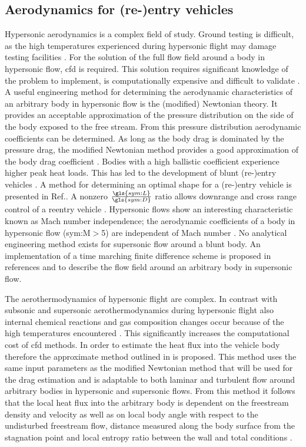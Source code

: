 \subsection{Aerodynamics for (re-)entry vehicles} \label{sec:aero}
Hypersonic aerodynamics is a complex field of study. Ground testing is difficult, as the high temperatures experienced during hypersonic flight may damage testing facilities \cite{AndersonJr.2006, Bertin1994}. For the solution of the full flow field around a body in hypersonic flow, \gls{cfd} is required. This solution requires significant knowledge of the problem to implement, is computationally expensive and difficult to validate \cite{AndersonJr.2006, Bertin1994}. A useful engineering method for determining the aerodynamic characteristics of an arbitrary body in hypersonic flow is the (modified) Newtonian theory. It provides an acceptable approximation of the pressure distribution on the side of the body exposed to the free stream. From this pressure distribution aerodynamic coefficients can be determined. As long as the body drag is dominated by the pressure drag, the modified Newtonian method provides a good approximation of the body drag coefficient \cite{AndersonJr.2006, Bertin1994, Bertin2006}. Bodies with a high ballistic coefficient experience higher peak heat loads. This has led to the development of blunt (re-)entry vehicles \cite{Bertin1994,Theisinger2009}. A method for determining an optimal shape for a (re-)entry vehicle is presented in Ref.\cite{Theisinger2009}. A nonzero $\frac{\gls{sym:L}}{\gls{sym:D}}$ ratio allows downrange and cross range control of a reentry vehicle \cite{Theisinger2009}. Hypersonic flows show an interesting characteristic known as Mach number independence; the aerodynamic coefficients of a body in hypersonic flow (\gls{sym:M}$>$5) are independent of Mach number \cite{Bertin1994,AndersonJr.2007,Hollis}. No analytical engineering method exists for supersonic flow around a blunt body. An implementation of a time marching finite difference scheme is proposed in references \cite{AndersonJr.2007} and \cite{AndersonJr.2006} to describe the flow field around an arbitrary body in supersonic flow. 

The aerothermodynamics of hypersonic flight are complex. In contrast with subsonic and supersonic aerothermodynamics during hypersonic flight also internal chemical reactions and gas composition changes occur  because of the high temperatures encountered \cite{AndersonJr.2006}. This significantly increases the computational cost of \gls{cfd} methods. In order to estimate the heat flux into the vehicle body therefore the approximate method outlined in \cite{Tauber1986, AndersonJr.2006} is proposed. This method uses the same input parameters as the modified Newtonian method that will be used for the drag estimation and is adaptable to both laminar and turbulent flow around arbitrary bodies in hypersonic and supersonic flows. From this method it follows that the local heat flux into the arbitrary body is dependent on the freestream density and velocity as well as on local body angle with respect to the undisturbed freestream flow, distance measured along the body surface from the stagnation point and local entropy ratio between the wall and total conditions \cite{Tauber1986, AndersonJr.2006}.